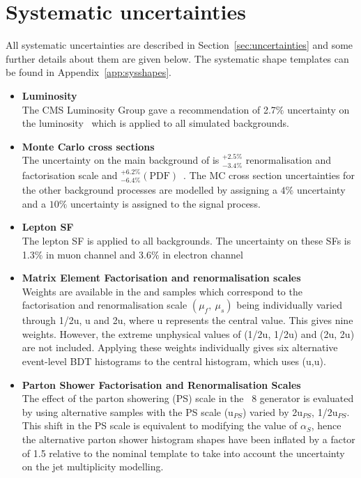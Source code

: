 \section{Systematic uncertainties}
\label{sec:uncertainties13}
All systematic uncertainties are described in Section~\ref{sec:uncertainties} and some further details about them are given below. The systematic shape templates can be found in Appendix~\ref{app:sysshapes}.

\begin{itemize}
\item \textbf{Luminosity}\\
The CMS Luminosity Group gave a recommendation of 2.7$\%$ uncertainty on the luminosity~\cite{CMS-PAS-LUM-15-001} which is applied to all simulated backgrounds.
\item \textbf{Monte Carlo cross sections}\\
The uncertainty on the main background of \ttbar is ${}^{+2.5\%}_{-3.4\%}$ renormalisation and factorisation scale and ${}^{+6.2\%}_{-6.4\%} \left( \textrm{PDF} \right)$~\cite{PhysRevLett.110.252004}. The MC cross section uncertainties for the other background processes are modelled by assigning a $4\%$ uncertainty and a $10\%$ uncertainty is assigned to the signal process.
\item \textbf{Lepton SF}\\
The lepton SF is applied to all backgrounds. The uncertainty on these SFs is 1.3$\%$ in muon channel and 3.6$\%$ in electron channel
\item \textbf{Matrix Element Factorisation and renormalisation scales}\\
Weights are available in the \ttbar and \tttt samples which correspond to the factorisation and renormalisation scale $\left(\mu_{f},~\mu_{s}\right)$ being individually varied through 1/2u, u and 2u, where u represents the central value. This gives nine weights. However, the extreme unphysical values of (1/2u, 1/2u) and (2u, 2u) are not included. Applying these weights individually gives six alternative event-level BDT histograms to the central histogram, which uses (u,u). 
\item \textbf{Parton Shower Factorisation and Renormalisation Scales}\\
The effect of the parton showering (PS) scale in the \PYTHIA~8 generator is evaluated by using alternative \ttbar samples with the PS scale (u$_{PS}$) varied by 2u$_{PS}$, 1/2u$_{PS}$. This shift in the PS scale is equivalent to modifying the value of $\alpha_{S}$, hence the alternative parton shower histogram shapes have been inflated by a factor of 1.5 relative to the nominal template to take into account the uncertainty on the jet multiplicity modelling.

\end{itemize}
